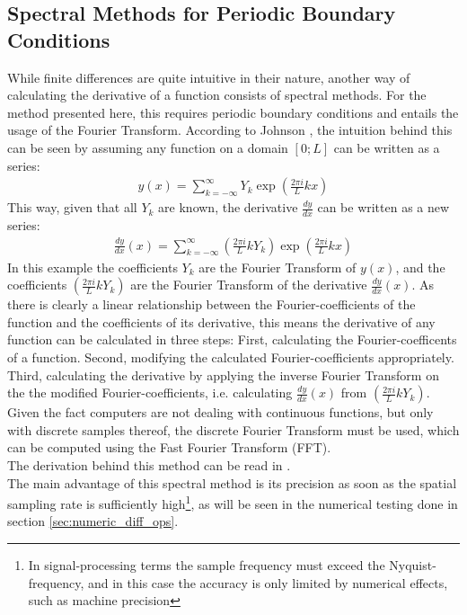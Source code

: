 \subsection{Spectral Methods for Periodic Boundary Conditions}
While finite differences are quite intuitive in their nature, another way of calculating the derivative of a function consists of spectral methods.
For the method presented here, this requires periodic boundary conditions and entails the usage of the Fourier Transform.
According to Johnson \cite{johnson2011notes}, the intuition behind this can be seen by assuming any function on a domain $[0;L]$ can be written as a series:
\begin{align*}
y(x) = \sum_{k=-\infty}^{\infty}Y_k\exp \left(\frac{2\pi i}{L}kx\right)
\end{align*}
This way, given that all $Y_k$ are known, the derivative $\frac{dy}{dx}$ can be written as a new series:
\begin{align*}
\frac{dy}{dx}(x) = \sum_{k=-\infty}^{\infty}\left(\frac{2\pi i}{L}kY_k\right)\exp \left(\frac{2\pi i}{L}kx\right)
\end{align*}
In this example the coefficients $Y_k$ are the Fourier Transform of $y(x)$, and the coefficients $(\frac{2\pi i}{L}kY_k)$ are the Fourier Transform of the derivative $\frac{dy}{dx}(x)$.
As there is clearly a linear relationship between the Fourier-coefficients of the function and the coefficients of its derivative, this means the derivative of any function can be calculated in three steps:
First, calculating the Fourier-coefficents of a function.
Second, modifying the calculated Fourier-coefficients appropriately.
Third, calculating the derivative by applying the inverse Fourier Transform on the the modified Fourier-coefficients, i.e. calculating $\frac{dy}{dx}(x)$ from $(\frac{2\pi i}{L}kY_k)$.\\
Given the fact computers are not dealing with continuous functions, but only with discrete samples thereof, the discrete Fourier Transform must be used, which can be computed using the Fast Fourier Transform (FFT).\\
The derivation behind this method can be read in \cite{johnson2011notes}.\\
The main advantage of this spectral method is its precision as soon as the spatial sampling rate is sufficiently high\footnote{In signal-processing terms the sample frequency must exceed the Nyquist-frequency, and in this case the accuracy is only limited by numerical effects, such as machine precision}, as will be seen in the numerical testing done in section \ref{sec:numeric_diff_ops}.\\

